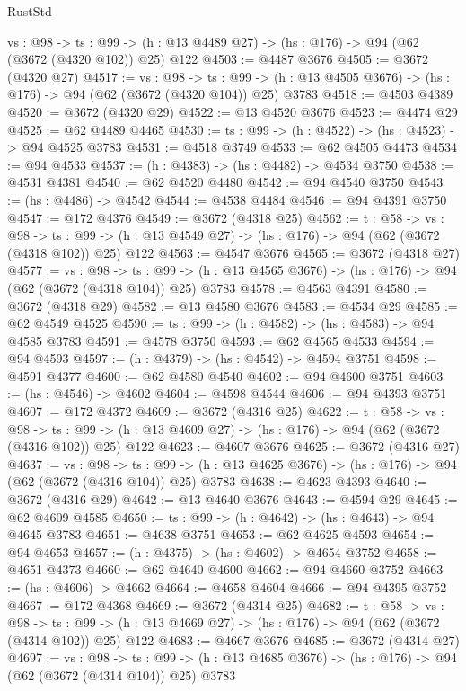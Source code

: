 \begin{lexlean}{RustStd}
\begin{coremodule}
{\begin{coremodule}
{{{{{{{{{  {vs : @98} ->
  {ts : @99} -> (h : @13 @4489 @27) -> (hs : @176) -> @94 (@62 (@3672 (@4320 @102)) @25) @122
@4503 := @4487 @3676
@4505 := @3672 (@4320 @27)
@4517 := {vs : @98} ->
  {ts : @99} -> (h : @13 @4505 @3676) -> (hs : @176) -> @94 (@62 (@3672 (@4320 @104)) @25) @3783
@4518 := @4503 @4389
@4520 := @3672 (@4320 @29)
@4522 := @13 @4520 @3676
@4523 := @4474 @29
@4525 := @62 @4489 @4465
@4530 := {ts : @99} -> (h : @4522) -> (hs : @4523) -> @94 @4525 @3783
@4531 := @4518 @3749
@4533 := @62 @4505 @4473
@4534 := @94 @4533
@4537 := (h : @4383) -> (hs : @4482) -> @4534 @3750
@4538 := @4531 @4381
@4540 := @62 @4520 @4480
@4542 := @94 @4540 @3750
@4543 := (hs : @4486) -> @4542
@4544 := @4538 @4484
@4546 := @94 @4391 @3750
@4547 := @172 @4376
@4549 := @3672 (@4318 @25)
@4562 := {t : @58} ->
  {vs : @98} ->
  {ts : @99} -> (h : @13 @4549 @27) -> (hs : @176) -> @94 (@62 (@3672 (@4318 @102)) @25) @122
@4563 := @4547 @3676
@4565 := @3672 (@4318 @27)
@4577 := {vs : @98} ->
  {ts : @99} -> (h : @13 @4565 @3676) -> (hs : @176) -> @94 (@62 (@3672 (@4318 @104)) @25) @3783
@4578 := @4563 @4391
@4580 := @3672 (@4318 @29)
@4582 := @13 @4580 @3676
@4583 := @4534 @29
@4585 := @62 @4549 @4525
@4590 := {ts : @99} -> (h : @4582) -> (hs : @4583) -> @94 @4585 @3783
@4591 := @4578 @3750
@4593 := @62 @4565 @4533
@4594 := @94 @4593
@4597 := (h : @4379) -> (hs : @4542) -> @4594 @3751
@4598 := @4591 @4377
@4600 := @62 @4580 @4540
@4602 := @94 @4600 @3751
@4603 := (hs : @4546) -> @4602
@4604 := @4598 @4544
@4606 := @94 @4393 @3751
@4607 := @172 @4372
@4609 := @3672 (@4316 @25)
@4622 := {t : @58} ->
  {vs : @98} ->
  {ts : @99} -> (h : @13 @4609 @27) -> (hs : @176) -> @94 (@62 (@3672 (@4316 @102)) @25) @122
@4623 := @4607 @3676
@4625 := @3672 (@4316 @27)
@4637 := {vs : @98} ->
  {ts : @99} -> (h : @13 @4625 @3676) -> (hs : @176) -> @94 (@62 (@3672 (@4316 @104)) @25) @3783
@4638 := @4623 @4393
@4640 := @3672 (@4316 @29)
@4642 := @13 @4640 @3676
@4643 := @4594 @29
@4645 := @62 @4609 @4585
@4650 := {ts : @99} -> (h : @4642) -> (hs : @4643) -> @94 @4645 @3783
@4651 := @4638 @3751
@4653 := @62 @4625 @4593
@4654 := @94 @4653
@4657 := (h : @4375) -> (hs : @4602) -> @4654 @3752
@4658 := @4651 @4373
@4660 := @62 @4640 @4600
@4662 := @94 @4660 @3752
@4663 := (hs : @4606) -> @4662
@4664 := @4658 @4604
@4666 := @94 @4395 @3752
@4667 := @172 @4368
@4669 := @3672 (@4314 @25)
@4682 := {t : @58} ->
  {vs : @98} ->
  {ts : @99} -> (h : @13 @4669 @27) -> (hs : @176) -> @94 (@62 (@3672 (@4314 @102)) @25) @122
@4683 := @4667 @3676
@4685 := @3672 (@4314 @27)
@4697 := {vs : @98} ->
  {ts : @99} -> (h : @13 @4685 @3676) -> (hs : @176) -> @94 (@62 (@3672 (@4314 @104)) @25) @3783
}}}}}}}}}
\end{coremodule}}
\end{coremodule}
\end{lexlean}
